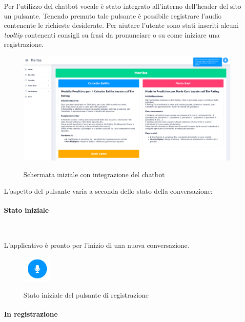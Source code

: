 	\noindent Per l'utilizzo del \gls{chatbot} vocale è stato integrato all'interno dell'header del sito un pulsante.
	Tenendo premuto tale pulsante è possibile registrare l'audio contenente le richieste desiderate. Per aiutare l'utente
	sono stati inseriti alcuni \emph{tooltip} contenenti consigli su frasi da pronunciare o su come iniziare una registrazione.
	
	\begin{figure}[H]
		\centering
		\includegraphics[width=\textwidth]{immagini/pulsanteStart.png} \\
		\caption{\label{fig:audio-start} Schermata iniziale con integrazione del chatbot}
	\end{figure}
	
	\bigskip

	\noindent L'aspetto del pulsante varia a seconda dello stato della conversazione:
	
	\paragraph{Stato iniziale}  ~\smallskip 
	
	\noindent L'applicativo è pronto per l'inizio di una nuova conversazione. 
	
	\begin{figure}[H]
		\centering
		\includegraphics[width=1.5cm]{immagini/stato_iniziale.png} \\
		\caption{\label{fig:stato-iniziale} Stato iniziale del pulsante di registrazione}
	\end{figure}

	\paragraph{In registrazione}  ~\smallskip 
	
